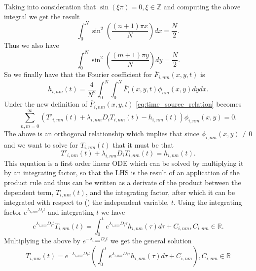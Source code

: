 \documentclass[\main/thesis.tex]{subfiles}
\begin{document}
Taking into consideration that $\sin(\xi \pi) {=} 0, \xi {\in} \mathbb{Z}$ and computing the above integral we get the result
\begin{equation*}
\int_{0}^{N} \sin^2\left( \frac{(n+1)\pi x}{N} \right) dx {=} \frac{N}{2}.
\end{equation*}
Thus we also have
\begin{equation*}
\int_{0}^{N} \sin^2\left( \frac{(m+1)\pi y}{N} \right) dy {=} \frac{N}{2}.
\end{equation*}
So we finally have that the Fourier coefficient for $\overline{F}_{i,nm}(x, y, t)$ is 
\begin{equation}
h_{i,nm}(t) {=} \frac{4}{N^2} \int_{0}^{N} \int_{0}^{N} \overline{F}_i(x, y, t) \phi_{nm}(x, y) dy dx.
\label{eq:fourier_coeff_F}
\end{equation} 
Under the new definition of $\overline{F}_{i, nm}(x, y, t)$ \eqref{eq:time_source_relation} becomes
\begin{equation*}
\sum_{n,m{=}0}^{\infty} \left( T'_{i,nm}(t) {+} \lambda_{i,nm} D_i T_{i,nm}(t) {-} h_{i,nm}(t) \right) \phi_{i,nm}(x, y) {=} 0.
\end{equation*}
The above is an orthogonal relationship which implies that since $\phi_{i,nm}(x, y) {\ne} 0$ and we want to solve for $T_{i,nm}(t)$ that it must be that
\begin{equation*}
T'_{i,nm}(t) {+} \lambda_{i,nm} D_i T_{i,nm}(t) {=} h_{i,nm}(t).
\end{equation*}
This equation is a first order linear ODE which can be solved by multiplying it by an integrating factor, so that the LHS is the result of an application of the product rule and thus can be written as a 
derivate of the product between the dependent term, $T_{i,nm}(t)$, and the integrating factor, after which it can be integrated with respect to (\wrt) the independent variable, $t$. 
Using the integrating factor $e^{\lambda_{i, nm} D_i t}$ and integrating \wrt $t$ we have  
\begin{equation*}
e^{\lambda_{i,nm} D_i t} T_{i,nm}(t) {=} \int_{0}^{t} e^{\lambda_{i,nm} D_i \tau} h_{i,nm}(\tau) d\tau {+} C_{i,nm}, C_{i,nm} {\in} \mathbb{R}.
\end{equation*}
Multiplying the above by $e^{\minus\lambda_{i,nm} D_i t}$ we get the general solution
\begin{equation}
T_{i,nm}(t) {=} e^{\minus\lambda_{i,nm} D_i t} \left( \int_{0}^{t} e^{\lambda_{i,nm} D_i \tau} h_{i,nm}(\tau) d\tau {+} C_{i,nm} \right), C_{i,nm} {\in} \mathbb{R}
\label{eq:time_depen_sol}
\end{equation}
\end{document}
